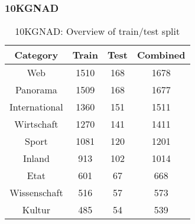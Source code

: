 \subsubsection{\ac{10KGNAD}}

\begin{table}[!ht]
	\centering
	\begin{tabular}{|c|c|c|c|}
		\hline
		Category		& Train	& Test  & Combined  \\ \hline
		Web				& 1510 	& 168	& 1678 		\\ \hline
		Panorama 		& 1509 	& 168	& 1677		\\ \hline
		International 	& 1360	& 151	& 1511		\\ \hline
		Wirtschaft 		& 1270	& 141	& 1411		\\ \hline
		Sport 			& 1081	& 120	& 1201		\\ \hline
		Inland 			& 913	& 102	& 1014		\\ \hline
		Etat 			& 601	& 67	& 668		\\ \hline
		Wissenschaft 	& 516	& 57	& 573		\\ \hline
		Kultur 			& 485	& 54	& 539		\\ \hline
		
	\end{tabular}
	\caption{10KGNAD: Overview of train/test split}
	\label{table:10KGNAD}
\end{table}


